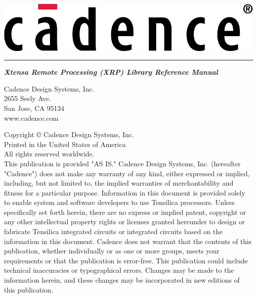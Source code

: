 \documentclass[twoside]{book}
\newcommand{\+}{\discretionary{\mbox{\scriptsize$\hookleftarrow$}}{}{}}
\begin{document}
\hypersetup{pageanchor=false,
             bookmarks=true,
             bookmarksnumbered=true,
             pdfencoding=unicode
            }
\begin{titlepage}
\vspace*{1.0in}
\includegraphics[scale=0.9]{Cadence_Logo_Red}
\vspace*{0.2in}
\hrule height0.5pt
\vspace*{0.5cm}
{\Huge\sl\bfseries Xtensa\raisebox{0.8ex}{\normalsize\textregistered} Remote Processing (XRP) Library Reference Manual}\\
\begin{flushright}
\vspace*{9.5cm}
Cadence Design Systems, Inc.\\
2655 Seely Ave.\\
San Jose, CA 95134\\
www.cadence.com\\
\end{flushright}
\newpage
\pagestyle{empty}
{\small
Copyright {\copyright} {\the\year} Cadence Design Systems, Inc.\\
Printed in the United States of America\\
All rights reserved worldwide.\\
\vspace*{0.5cm}
\newline This publication is provided "AS IS." Cadence Design Systems, Inc. (hereafter "Cadence") does not make any warranty of any kind, either expressed or implied, including, but not limited to, the implied warranties of merchantability and fitness for a particular purpose. Information in this document is provided solely to enable system and software developers to use Tensilica processors. Unless specifically set forth herein, there are no express or implied patent, copyright or any other intellectual property rights or licenses granted hereunder to design or fabricate Tensilica integrated circuits or integrated circuits based on the information in this document. Cadence does not warrant that the contents of this publication, whether individually or as one or more groups, meets your requirements or that the publication is error-free. This publication could include technical inaccuracies or typographical errors. Changes may be made to the information herein, and these changes may be incorporated in new editions of this publication.
}
\end{titlepage}
\end{document}
